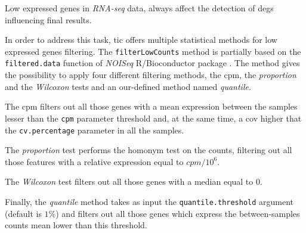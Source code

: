 Low expressed genes in \textit{RNA-seq} data, always affect the detection of \glspl{deg} \cite{Sha2015} influencing final results.

In order to address this task, \gls{tic} offers multiple statistical methods for low expressed genes filtering. 
The \lstinline!filterLowCounts! method is partially based on the \lstinline!filtered.data!  function of \textit{NOISeq} R/Bioconductor package \cite{Tarazona2011, Tarazona2015}. 
The method gives the possibility to apply four different filtering methods, the \gls{cpm}, the \textit{proportion} and the \textit{Wilcoxon} tests and an our-defined method named \textit{quantile}.

The \gls{cpm} filters out all those genes with a mean expression between the samples lesser than the \lstinline!cpm! parameter threshold and, at the same time, a \gls{cov} higher that the \lstinline!cv.percentage! parameter in all the samples.

The \textit{proportion} test performs the homonym test on the counts, filtering out all those features with a relative expression equal to $cpm/10^6$.

The \textit{Wilcoxon} test filters out all those genes with a median equal to $0$.

Finally, the \textit{quantile} method takes as input the \lstinline!quantile.threshold! argument (default is $1\%$) and filters out all those genes which express the between-samples counts mean lower than this threshold.